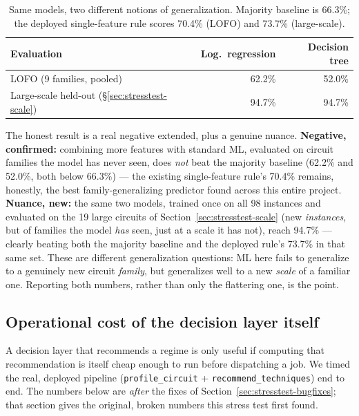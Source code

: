 \documentclass[9pt,twocolumn]{extarticle}
\begin{document}
\begin{table}[t]
\centering\footnotesize
\begin{tabular}{lrr}
\toprule
Evaluation & Log.\ regression & Decision tree \\
\midrule
LOFO (9 families, pooled) & 62.2\% & 52.0\% \\
Large-scale held-out (\S\ref{sec:stresstest-scale}) & 94.7\% & 94.7\% \\
\bottomrule
\end{tabular}
\caption{Same models, two different notions of generalization. Majority
baseline is 66.3\%; the deployed single-feature rule scores 70.4\% (LOFO)
and 73.7\% (large-scale).}
\label{tab:mlgen}
\end{table}

The honest result is a real negative extended, plus a genuine nuance.
\textbf{Negative, confirmed:} combining more features with standard ML,
evaluated on circuit families the model has never seen, does \emph{not}
beat the majority baseline (62.2\% and 52.0\%, both below 66.3\%) --- the
existing single-feature rule's 70.4\% remains, honestly, the best
family-generalizing predictor found across this entire project.
\textbf{Nuance, new:} the same two models, trained once on all 98
instances and evaluated on the 19 large circuits of
Section~\ref{sec:stresstest-scale} (new \emph{instances}, but of families
the model \emph{has} seen, just at a scale it has not), reach 94.7\% ---
clearly beating both the majority baseline and the deployed rule's 73.7\%
in that same set. These are different generalization questions: ML here
fails to generalize to a genuinely new circuit \emph{family}, but
generalizes well to a new \emph{scale} of a familiar one. Reporting both
numbers, rather than only the flattering one, is the point.

\subsection{Operational cost of the decision layer itself}
\label{sec:stresstest-latency}
A decision layer that recommends a regime is only useful if computing that
recommendation is itself cheap enough to run before dispatching a job. We
timed the real, deployed pipeline (\texttt{profile\_circuit} +
\texttt{recommend\_techniques}) end to end. The numbers below are
\emph{after} the fixes of Section~\ref{sec:stresstest-bugfixes}; that
section gives the original, broken numbers this stress test first found.
\end{document}
